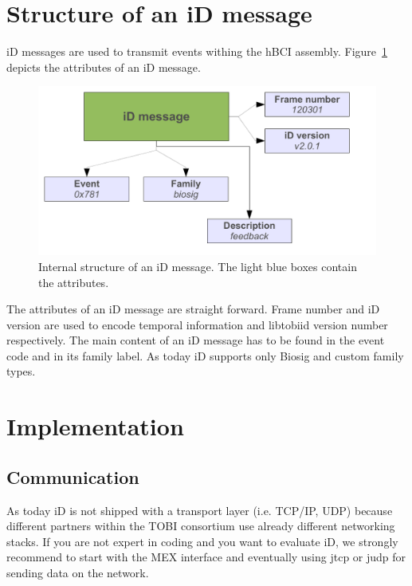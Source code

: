 \documentclass[a4paper,10pt]{article}
\begin{document}
\section{Structure of an iD message}
\label{sec:idstructure}
iD messages are used to transmit events withing the hBCI assembly.
Figure~\ref{fig:hbci:ismessage} depicts the attributes of an iD message.
\begin{figure}[!htb]
  \begin{center}
	\includegraphics[width=\textwidth]{figures/idmessage.pdf}
	\caption{Internal structure of an iD message. The light blue boxes contain
	the attributes.}
	\label{fig:hbci:ismessage}
  \end{center}
\end{figure}
The attributes of an iD message are straight forward. Frame number and iD
version are used to encode temporal information and libtobiid version number
respectively.
The main content of an iD message has to be found in the event code and in its
family label. As today iD supports only Biosig and custom family types.


\section{Implementation}
\label{sec:implementation}

\subsection{Communication}
\label{sec:transport}
As today iD is not shipped with a transport layer (i.e. TCP/IP, UDP) because
different partners within the TOBI consortium use already different networking
stacks. 
If you are not expert in coding and you want to evaluate iD, we strongly
recommend to start with the MEX interface and eventually using jtcp or judp for
sending data on the network.
\end{document}
